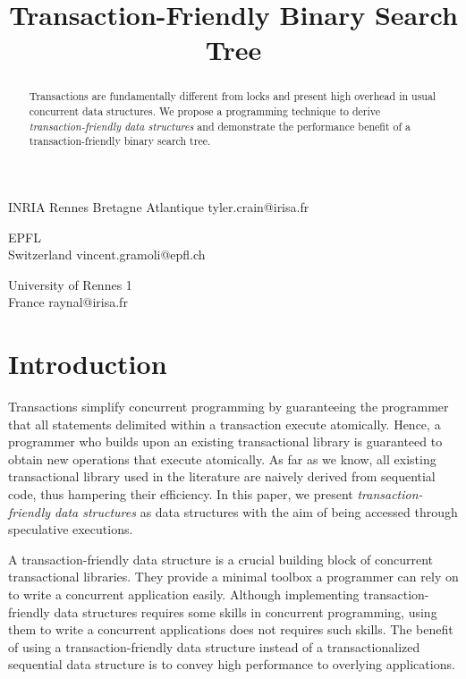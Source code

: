 \documentclass[10pt]{sigplanconf}
\begin{document}
\title{Transaction-Friendly Binary Search Tree}

           {INRIA Rennes Bretagne Atlantique}
           {tyler.crain@irisa.fr}

           {EPFL\\Switzerland}
           {vincent.gramoli@epfl.ch}

           {University of Rennes 1\\France}
           {raynal@irisa.fr}


\newpage

\maketitle

\setcounter{page}{1}

\begin{abstract}
Transactions are fundamentally different from locks and present high overhead in usual concurrent data structures. 
We propose a programming technique to derive \emph{transaction-friendly data structures} and demonstrate the performance benefit of a 
transaction-friendly binary search tree.
\end{abstract}

\section{Introduction}

Transactions simplify concurrent programming by guaranteeing the programmer 
that all statements delimited within a transaction execute atomically.
Hence, a programmer who builds upon an existing transactional library 
is guaranteed to obtain new operations that execute atomically.
As far as we know, all existing transactional library used in the 
literature are naively derived from sequential code, thus hampering their 
efficiency.
In this paper, we present \emph{transaction-friendly data structures} as 
data structures with the aim of being accessed through speculative executions.

A transaction-friendly data structure is a crucial building block of 
concurrent transactional libraries. They provide a minimal toolbox a 
programmer can rely on to write a concurrent application easily.
Although implementing transaction-friendly data structures requires some skills 
in concurrent programming, using them to write a concurrent applications 
does not requires such skills. The benefit of using a 
transaction-friendly data structure instead of a transactionalized sequential 
data structure is to convey high performance to overlying applications.
\end{document}
